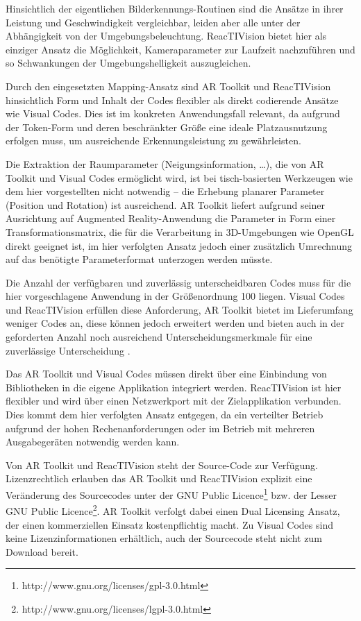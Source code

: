Hinsichtlich der eigentlichen Bilderkennungs-Routinen sind die Ansätze in ihrer Leistung und Geschwindigkeit vergleichbar, leiden aber alle unter der Abhängigkeit von der Umgebungsbeleuchtung. ReacTIVision bietet hier als einziger Ansatz die Möglichkeit, Kameraparameter zur Laufzeit nachzuführen und so Schwankungen der Umgebungshelligkeit auszugleichen.

Durch den eingesetzten Mapping-Ansatz sind AR Toolkit und ReacTIVision hinsichtlich Form und Inhalt der Codes flexibler als direkt codierende Ansätze wie Visual Codes. Dies ist im konkreten Anwendungsfall relevant, da aufgrund der Token-Form und deren beschränkter Größe eine ideale Platzausnutzung erfolgen muss, um ausreichende Erkennungsleistung zu gewährleisten.

Die Extraktion der Raumparameter (Neigungsinformation, \ldots), die von AR Toolkit und Visual Codes ermöglicht wird, ist bei tisch-basierten Werkzeugen wie dem hier vorgestellten nicht notwendig -- die Erhebung planarer Parameter (Position und Rotation) ist ausreichend. AR Toolkit liefert aufgrund seiner Ausrichtung auf Augmented Reality-Anwendung die Parameter in Form einer Transformationsmatrix, die für die Verarbeitung in 3D-Umgebungen wie OpenGL direkt geeignet ist, im hier verfolgten Ansatz jedoch einer zusätzlich Umrechnung auf das benötigte Parameterformat unterzogen werden müsste.

Die Anzahl der verfügbaren und zuverlässig unterscheidbaren Codes muss für die hier vorgeschlagene Anwendung in der Größenordnung 100 liegen. Visual Codes und ReacTIVision erfüllen diese Anforderung, AR Toolkit bietet im Lieferumfang weniger Codes an, diese können jedoch erweitert werden und bieten auch in der geforderten Anzahl noch ausreichend Unterscheidungsmerkmale für eine zuverlässige Unterscheidung \citep{Wagner03}.

Das AR Toolkit und Visual Codes müssen direkt über eine Einbindung von Bibliotheken in die eigene Applikation integriert werden. ReacTIVision ist hier flexibler und wird über einen Netzwerkport mit der Zielapplikation verbunden. Dies kommt dem hier verfolgten Ansatz entgegen, da ein verteilter Betrieb aufgrund der hohen Rechenanforderungen oder im Betrieb mit mehreren Ausgabegeräten notwendig werden kann.

Von AR Toolkit und ReacTIVision steht der Source-Code zur Verfügung. Lizenzrechtlich erlauben das AR Toolkit und ReacTIVision explizit eine Veränderung des Sourcecodes unter der GNU Public Licence\footnote{http://www.gnu.org/licenses/gpl-3.0.html} bzw. der Lesser GNU Public Licence\footnote{http://www.gnu.org/licenses/lgpl-3.0.html}. AR Toolkit verfolgt dabei einen Dual Licensing Ansatz, der einen kommerziellen Einsatz kostenpflichtig macht. Zu Visual Codes sind keine Lizenzinformationen erhältlich, auch der Sourcecode steht nicht zum Download bereit.

